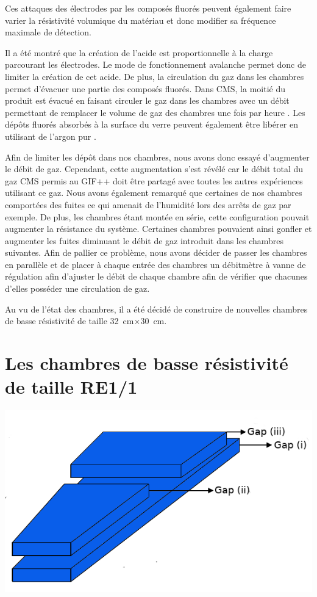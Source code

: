 Ces attaques des électrodes par les composés fluorés peuvent également faire varier la résistivité volumique du matériau et donc modifier sa fréquence maximale de détection.

Il a été montré que la création de l'acide  est proportionnelle à la charge parcourant les électrodes. Le mode de fonctionnement avalanche permet donc de limiter la création de cet acide. De plus, la circulation du gaz dans les chambres permet d'évacuer une partie des composés fluorés. Dans CMS, la moitié du  produit est évacué en faisant circuler le gaz dans les chambres avec un débit permettant de remplacer le volume de gaz des chambres une fois par heure \cite{Abbrescia:2006hk}. Les dépôts fluorés absorbés à la surface du verre peuvent également être libérer en utilisant de l'argon pur \cite{Band:2008zza}.

Afin de limiter les dépôt dans nos chambres, nous avons donc essayé d'augmenter le débit de gaz. Cependant, cette augmentation s'est révélé car le débit total du gaz CMS permis au GIF++ doit être partagé avec toutes les autres expériences utilisant ce gaz.
Nous avons également remarqué que certaines de nos chambres comportées des fuites ce qui amenait de l'humidité lors des arrêts de gaz par exemple. De plus, les chambres étant montée en série, cette configuration pouvait augmenter la résistance du système. Certaines chambres pouvaient ainsi gonfler et augmenter les fuites diminuant le débit de gaz introduit dans les chambres suivantes. Afin de pallier ce problème, nous avons décider de passer les chambres en parallèle et de placer à chaque entrée des chambres un débitmètre à vanne de régulation afin d'ajuster le débit de chaque chambre afin de vérifier que chacunes d'elles posséder une circulation de gaz.

Au vu de l'état des chambres, il a été décidé de construire de nouvelles chambres de basse résistivité de taille \SI{32}{\centi\meter}$\times$\SI{30}{\centi\meter}.

\newpage
\section{Les chambres de basse résistivité de taille RE1/1}

\marginpar
{
	\centering
	\includegraphics[width=1.0\marginparwidth]{GLA/gaps.png}
	\label{gap}
}


